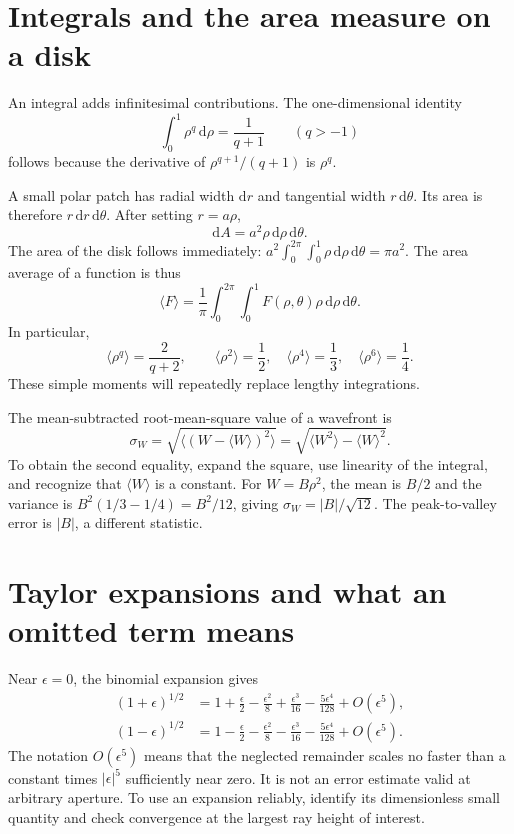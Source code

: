 \section{Integrals and the area measure on a disk}
An integral adds infinitesimal contributions. The one-dimensional identity
\[
\int_0^1\rho^q\,\mathrm{d}\rho=\frac{1}{q+1}\qquad(q>-1)
\]
follows because the derivative of $\rho^{q+1}/(q+1)$ is $\rho^q$.

A small polar patch has radial width $\mathrm{d}r$ and tangential width $r\,\mathrm{d}\theta$. Its area is therefore $r\,\mathrm{d}r\,\mathrm{d}\theta$. After setting $r=a\rho$,
\[
\mathrm{d}A=a^2\rho\,\mathrm{d}\rho\,\mathrm{d}\theta.
\]
The area of the disk follows immediately: $a^2\int_0^{2\pi}\int_0^1\rho\,\mathrm{d}\rho\,\mathrm{d}\theta=\pi a^2$. The area average of a function is thus
\begin{equation}
\langle F\rangle=
\frac{1}{\pi}\int_0^{2\pi}\int_0^1
F(\rho,\theta)\rho\,\mathrm{d}\rho\,\mathrm{d}\theta.
\label{fnd:average}
\end{equation}
In particular,
\[
\langle\rho^q\rangle=\frac{2}{q+2},\qquad
\langle\rho^2\rangle=\frac12,\quad
\langle\rho^4\rangle=\frac13,\quad
\langle\rho^6\rangle=\frac14.
\]
These simple moments will repeatedly replace lengthy integrations.

The mean-subtracted root-mean-square value of a wavefront is
\begin{equation}
\sigma_W=\sqrt{\langle(W-\langle W\rangle)^2\rangle}
=\sqrt{\langle W^2\rangle-\langle W\rangle^2}.
\label{fnd:rms}
\end{equation}
To obtain the second equality, expand the square, use linearity of the integral, and recognize that $\langle W\rangle$ is a constant. For $W=B\rho^2$, the mean is $B/2$ and the variance is $B^2(1/3-1/4)=B^2/12$, giving $\sigma_W=|B|/\sqrt{12}$. The peak-to-valley error is $|B|$, a different statistic.

\section{Taylor expansions and what an omitted term means}
Near $\epsilon=0$, the binomial expansion gives
\begin{align}
(1+\epsilon)^{1/2}
&=1+\frac{\epsilon}{2}-\frac{\epsilon^2}{8}
+\frac{\epsilon^3}{16}-\frac{5\epsilon^4}{128}+
O(\epsilon^5),\\
(1-\epsilon)^{1/2}
&=1-\frac{\epsilon}{2}-\frac{\epsilon^2}{8}
-\frac{\epsilon^3}{16}-\frac{5\epsilon^4}{128}+
O(\epsilon^5).
\end{align}
The notation $O(\epsilon^5)$ means that the neglected remainder scales no faster than a constant times $|\epsilon|^5$ sufficiently near zero. It is not an error estimate valid at arbitrary aperture. To use an expansion reliably, identify its dimensionless small quantity and check convergence at the largest ray height of interest.


